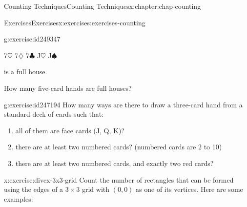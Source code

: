 \documentclass[oneside,10pt,]{book}
\numberwithin{equation}{section}
\begin{document}
\begin{chapterptx}{Counting Techniques}{}{Counting Techniques}{}{}{x:chapter:chap-counting}
\begin{exercises-section}{Exercises}{}{Exercises}{}{}{x:exercises:exercises-counting}
\begin{divisionexercise}{10}{}{}{g:exercise:id249347}
\begin{sidebyside}{1}{0.3}{0.3}{0}%
\begin{sbspanel}{0.4}%
7\(\heartsuit\) 7\(\diamondsuit\) 7\(\clubsuit\) J\(\heartsuit\) J\(\spadesuit\)%
\end{sbspanel}%
\end{sidebyside}%
\par
is a full house.%
\par
How many five-card hands are full houses?%
\end{divisionexercise}%
\begin{divisionexercise}{11}{}{}{g:exercise:id247194}%
How many ways are there to draw a three-card hand from a standard deck of cards such that:%
\begin{enumerate}[label=(\alph*)]
\item{}all of them are face cards (J, Q, K)?%
\item{}there are at least two numbered cards? (numbered cards are 2 to 10)%
\item{}there are at least two numbered cards, and exactly two red cards?%
\end{enumerate}
%
\end{divisionexercise}%
\begin{divisionexercise}{12}{}{}{x:exercise:divex-3x3-grid}%
Count the number of rectangles that can be formed using the edges of a \(3 \times 3\) grid with \((0,0)\) as one of its vertices. Here are some examples:%
\begin{sidebyside}{3}{0.0916666666666667}{0.0916666666666667}{0.183333333333333}%
\begin{sbspanel}{0.15}%
%
\end{sbspanel}%
\begin{sbspanel}{0.15}%
%
\end{sbspanel}%
\begin{sbspanel}{0.15}%

\end{sbspanel}
\end{sidebyside}
\end{divisionexercise}
\end{exercises-section}
\end{chapterptx}
\end{document}
